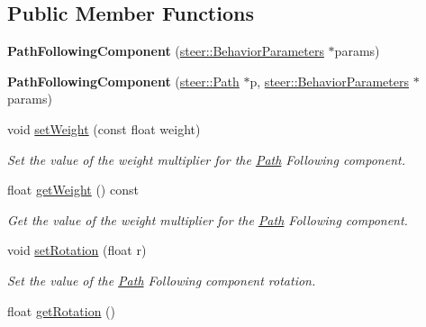 \subsection*{Public Member Functions}
\begin{DoxyCompactItemize}
\item 
\hypertarget{classsteer_1_1_path_following_component_a5d874cbfb0538b9766c8539ec225524d}{{\bfseries Path\-Following\-Component} (\hyperlink{structsteer_1_1_behavior_parameters}{steer\-::\-Behavior\-Parameters} $\ast$params)}\label{classsteer_1_1_path_following_component_a5d874cbfb0538b9766c8539ec225524d}

\item 
\hypertarget{classsteer_1_1_path_following_component_a5cd103a2bd79b1f2b4ff39531534dce3}{{\bfseries Path\-Following\-Component} (\hyperlink{classsteer_1_1_path}{steer\-::\-Path} $\ast$p, \hyperlink{structsteer_1_1_behavior_parameters}{steer\-::\-Behavior\-Parameters} $\ast$params)}\label{classsteer_1_1_path_following_component_a5cd103a2bd79b1f2b4ff39531534dce3}

\item 
void \hyperlink{classsteer_1_1_path_following_component_a74524118217244adfb1d572706d2e357}{set\-Weight} (const float weight)
\begin{DoxyCompactList}\small\item\em Set the value of the weight multiplier for the \hyperlink{classsteer_1_1_path}{Path} Following component. \end{DoxyCompactList}\item 
\hypertarget{classsteer_1_1_path_following_component_ae6081f8fa8f25f01cacd778bcae3f085}{float \hyperlink{classsteer_1_1_path_following_component_ae6081f8fa8f25f01cacd778bcae3f085}{get\-Weight} () const }\label{classsteer_1_1_path_following_component_ae6081f8fa8f25f01cacd778bcae3f085}

\begin{DoxyCompactList}\small\item\em Get the value of the weight multiplier for the \hyperlink{classsteer_1_1_path}{Path} Following component. \end{DoxyCompactList}\item 
\hypertarget{classsteer_1_1_path_following_component_a3b6b6a7a99853dfe9579b0022962239a}{void \hyperlink{classsteer_1_1_path_following_component_a3b6b6a7a99853dfe9579b0022962239a}{set\-Rotation} (float r)}\label{classsteer_1_1_path_following_component_a3b6b6a7a99853dfe9579b0022962239a}

\begin{DoxyCompactList}\small\item\em Set the value of the \hyperlink{classsteer_1_1_path}{Path} Following component rotation. \end{DoxyCompactList}\item 
\hypertarget{classsteer_1_1_path_following_component_a5e40a561950d6b723b044472260bd2b8}{float \hyperlink{classsteer_1_1_path_following_component_a5e40a561950d6b723b044472260bd2b8}{get\-Rotation} ()}\label{classsteer_1_1_path_following_component_a5e40a561950d6b723b044472260bd2b8}


\end{DoxyCompactItemize}
